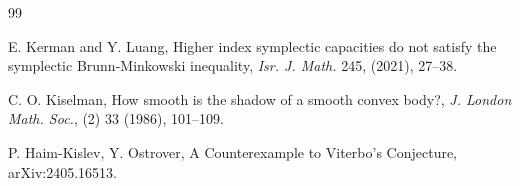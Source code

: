 \documentclass[12pt]{amsart}
\theoremstyle{definition}
\begin{document}
\begin{thebibliography} {99}









 E. Kerman and Y. Luang,  Higher index symplectic capacities do not satisfy the symplectic Brunn-Minkowski inequality, {\em Isr. J. Math.} 245, (2021), 27--38.  

 C. O. Kiselman, How smooth is the shadow of a smooth convex body?, {\em J. London Math. Soc.}, (2) 33 (1986), 101--109.

 P. Haim-Kislev, Y. Ostrover, A Counterexample to Viterbo's Conjecture, arXiv:2405.16513.





\end{thebibliography}
\end{document}
